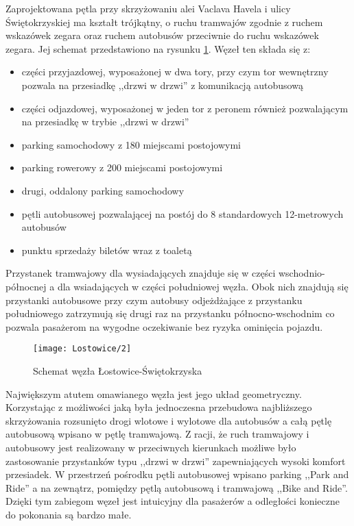 \documentclass[twoside,12pt]{article}
\begin{document}
	Zaprojektowana pętla przy skrzyżowaniu alei Vaclava Havela i ulicy Świętokrzyskiej ma kształt trójkątny, o ruchu tramwajów zgodnie z ruchem wskazówek zegara oraz ruchem autobusów przeciwnie do ruchu wskazówek zegara. Jej schemat przedstawiono na rysunku \ref{lostowice3}. Węzeł ten składa się z:
	\begin{itemize}\setlength{\itemsep}{0em}
	\item części przyjazdowej, wyposażonej w dwa tory, przy czym tor wewnętrzny pozwala na przesiadkę ,,drzwi w drzwi'' z komunikacją autobusową
	\item części odjazdowej, wyposażonej w jeden tor z peronem również pozwalającym  na przesiadkę w trybie ,,drzwi w drzwi''
	\item parking samochodowy z 180 miejscami postojowymi
	\item parking rowerowy z 200 miejscami postojowymi
	\item drugi, oddalony parking samochodowy
	\item pętli autobusowej pozwalającej na postój do 8 standardowych 12-metrowych autobusów
	\item punktu sprzedaży biletów wraz z toaletą
	\end{itemize}
	
	Przystanek tramwajowy dla wysiadających znajduje się w części wschodnio-północnej a dla wsiadających w części południowej węzła. Obok nich znajdują się przystanki autobusowe przy czym autobusy odjeżdżające z przystanku południowego zatrzymują się drugi raz na przystanku północno-wschodnim co pozwala pasażerom na wygodne oczekiwanie bez ryzyka ominięcia pojazdu. 
	
	\begin{figure}[H]
		\centering
		\texttt{[image: Lostowice/2]}\\
		\caption{Schemat węzła Łostowice-Świętokrzyska}
		\label{lostowice3}
	\end{figure}
	
	Największym atutem omawianego węzła jest jego układ geometryczny. Korzystając z możliwości jaką była jednoczesna przebudowa najbliższego skrzyżowania rozsunięto drogi wlotowe i wylotowe dla autobusów a całą pętlę autobusową wpisano w pętlę tramwajową. Z racji, że ruch tramwajowy i autobusowy jest realizowany w przeciwnych kierunkach możliwe było zastosowanie przystanków typu ,,drzwi w drzwi'' zapewniających wysoki komfort przesiadek. W przestrzeń pośrodku pętli autobusowej wpisano parking ,,Park and Ride'' a na zewnątrz, pomiędzy pętlą autobusową i tramwajową ,,Bike and Ride''. Dzięki tym zabiegom węzeł jest intuicyjny dla pasażerów a odległości konieczne do pokonania są bardzo małe. 
	
\end{document}
